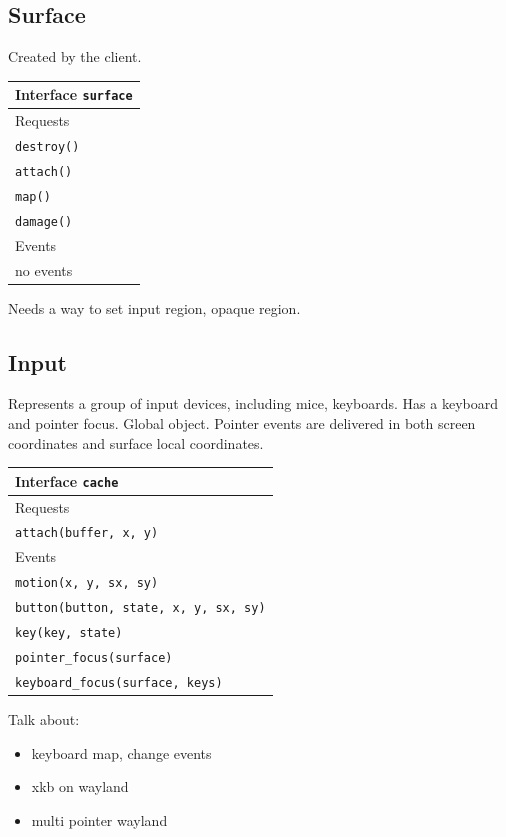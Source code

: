 \documentclass{article}
\begin{document}
\subsection{Surface}

Created by the client.

\begin{tabular}{l}
  \hline 
  Interface \texttt{surface} \\ \hline 
  Requests \\ \hline 
  \texttt{destroy()} \\
  \texttt{attach()} \\
  \texttt{map()} \\
  \texttt{damage()} \\ \hline
  Events \\ \hline
  no events \\ \hline
\end{tabular}

Needs a way to set input region, opaque region.

\subsection{Input}

Represents a group of input devices, including mice, keyboards.  Has a
keyboard and pointer focus.  Global object.  Pointer events are
delivered in both screen coordinates and surface local coordinates.

\begin{tabular}{l}
  \hline 
  Interface \texttt{cache} \\ \hline 
  Requests \\ \hline 
  \texttt{attach(buffer, x, y)} \\
  Events \\ \hline
  \texttt{motion(x, y, sx, sy)} \\
  \texttt{button(button, state, x, y, sx, sy)} \\
  \texttt{key(key, state)} \\
  \texttt{pointer\_focus(surface)} \\
  \texttt{keyboard\_focus(surface, keys)} \\ \hline
\end{tabular}

Talk about:

\begin{itemize}
\item keyboard map, change events
\item xkb on wayland
\item multi pointer wayland
\end{itemize}
\end{document}
